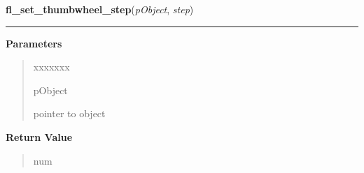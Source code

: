 \hspace{.8\funcindent}\begin{boxedminipage}{\funcwidth}

    \raggedright \textbf{fl\_set\_thumbwheel\_step}(\textit{pObject}, \textit{step})

    \vspace{-1.5ex}

    \rule{\textwidth}{0.5\fboxrule}
\setlength{\parskip}{2ex}
\setlength{\parskip}{1ex}
      \textbf{Parameters}
      \vspace{-1ex}

      \begin{quote}
        \begin{Ventry}{xxxxxxx}

          \item[pObject]

          pointer to object

        \end{Ventry}

      \end{quote}

      \textbf{Return Value}
    \vspace{-1ex}

      \begin{quote}
      num

      \end{quote}

    \end{boxedminipage}

    \label{xformslib:library:fl_set_thumbwheel_return}

    \vspace{0.5ex}

